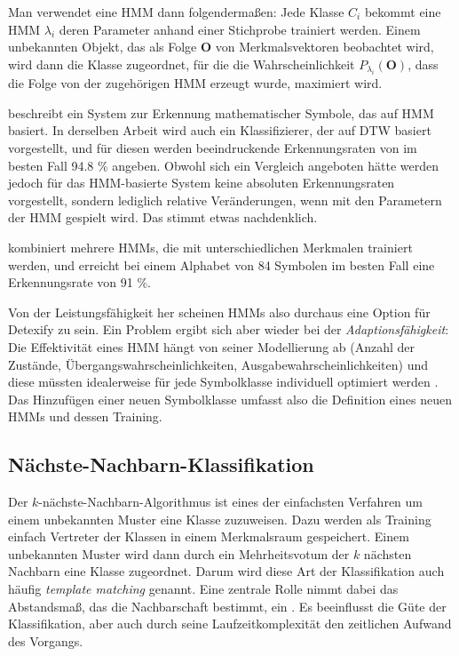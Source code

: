Man verwendet eine HMM dann folgendermaßen: Jede Klasse $C_i$ bekommt eine HMM $\lambda_i$ deren Parameter anhand einer Stichprobe trainiert werden. Einem unbekannten Objekt, das als Folge $\mathbf{O}$ von Merkmalsvektoren beobachtet wird, wird dann die Klasse zugeordnet, für die die Wahrscheinlichkeit $P_{\lambda_i}(\mathbf{O})$, dass die Folge von der zugehörigen HMM erzeugt wurde, maximiert wird.

\citet{Xie:2007p11427} beschreibt ein System zur Erkennung mathematischer Symbole, das auf HMM basiert. In derselben Arbeit wird auch ein Klassifizierer, der auf DTW basiert vorgestellt, und für diesen werden beeindruckende Erkennungsraten von im besten Fall 94.8 \% angeben. Obwohl sich ein Vergleich angeboten hätte werden jedoch für das HMM-basierte System keine absoluten Erkennungsraten vorgestellt, sondern lediglich relative Veränderungen, wenn mit den Parametern der HMM gespielt wird. Das stimmt etwas nachdenklich.

\citet{Winkler:1996p11716} kombiniert mehrere HMMs, die mit unterschiedlichen Merkmalen trainiert werden, und erreicht bei einem Alphabet von 84 Symbolen im besten Fall eine Erkennungsrate von 91 \%.

Von der Leistungsfähigkeit her scheinen HMMs also durchaus eine Option für Detexify zu sein. Ein Problem ergibt sich aber wieder bei der \emph{Adaptionsfähigkeit}: Die Effektivität eines HMM hängt von seiner Modellierung ab (Anzahl der Zustände, Übergangswahrscheinlichkeiten, Ausgabewahrscheinlichkeiten) und diese müssten idealerweise für jede Symbolklasse individuell optimiert werden \cite{Fitzgerald:2005p331}. Das Hinzufügen einer neuen Symbolklasse umfasst also die Definition eines neuen HMMs und dessen Training.

\subsection{Nächste-Nachbarn-Klassifikation} \label{sub:knn}

Der $k$-nächste-Nachbarn-Algorithmus \cite[S.18]{eva:pattern} ist eines der einfachsten Verfahren um einem unbekannten Muster eine Klasse zuzuweisen. Dazu werden als Training einfach Vertreter der Klassen in einem Merkmalsraum gespeichert. Einem unbekannten Muster wird dann durch ein Mehrheitsvotum der $k$ nächsten Nachbarn eine Klasse zugeordnet. Darum wird diese Art der Klassifikation auch häufig \emph{template matching} genannt. Eine zentrale Rolle nimmt dabei das Abstandsmaß, das die Nachbarschaft bestimmt, ein \cite{Jaeger:2003p1097}. Es beeinflusst die Güte der Klassifikation, aber auch durch seine Laufzeitkomplexität den zeitlichen Aufwand des Vorgangs.

